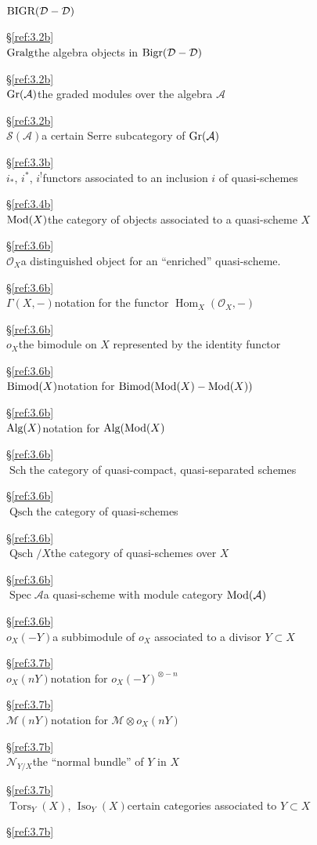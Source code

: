 \documentclass{amsproc}
\def\Ascr{{\mathcal A}}
\def\Dscr{{\mathcal D}}
\def\Mscr{{\mathcal M}}
\def\Nscr{{\mathcal N}}
\def\Oscr{{\mathcal O}}
\def\Sscr{{\mathcal S}}
\def\Mod{\mathop{\text{Mod}}}
\def\Bimod{\mathop{\text{Bimod}}}
\def\Gr{\mathop{\text{Gr}}}
\def\Bigr{\mathop{\text{Bigr}}}
\def\BIGR{\mathop{\text{BIGR}}}
\def\Alg{\mathop{\text{Alg}}}
\def\Gralg{\mathop{\text{Gralg}}}
\def\Sch{\operatorname{Sch}}
\def\Iso{\operatorname{Iso}}
\def\Tors{\operatorname{Tors}}
\def\QSch{\operatorname{Qsch}}
\def\Spec{\operatorname {Spec}}
\def\Hom{\operatorname {Hom}}
\def\Tors{\operatorname {Tors}}
\let\oldtext\text
\def\text#1{\oldtext{\upshape #1}}
\theoremstyle{definition}
\theoremstyle{remark}
\numberwithin{equation}{section}
\numberwithin{table}{section}
\numberwithin{figure}{section}
\def\Gr{\mathop{\text{Gr}}}
\begin{document}
\begin{tabbing}
$\BIGR(\Dscr-\Dscr)$\>\strut\hfill\S\ref{ref:3.2b}\>\\ $\Gralg$\>the
algebra objects in
$\Bigr(\Dscr-\Dscr)$\>\strut\hfill\S\ref{ref:3.2b}\>\\
$\Gr(\Ascr)$\>the graded modules over the algebra
$\Ascr$\>\strut\hfill\S\ref{ref:3.2b}\>\\
$\Sscr(\Ascr)$\>a certain Serre subcategory of $\Gr(\Ascr)$
\>\strut\hfill\S\ref{ref:3.3b}\>\\
$i_\ast$, $i^\ast$, $i^!$\>functors associated to an inclusion $i$ of
quasi-schemes\>\strut\hfill\S\ref{ref:3.4b}\>\\
$\Mod(X)$\>the category of objects associated to a quasi-scheme $X$\>
\strut\hfill\S\ref{ref:3.6b}\>\\
$\Oscr_X$\>a distinguished object for an ``enriched'' quasi-scheme.
\>\strut\hfill\S\ref{ref:3.6b}\>\\
$\Gamma(X,-)$\>notation for the functor $\Hom_X(\Oscr_X,-)$
\>\strut\hfill\S\ref{ref:3.6b}\>\\ 
$o_X$\>the bimodule on $X$ represented by the identity functor\>
\strut\hfill\S\ref{ref:3.6b}\>\\
$\Bimod(X)$\>notation for
$\Bimod(\Mod(X)-\Mod(X))$\>\strut\hfill\S\ref{ref:3.6b}\>\\ 
$\Alg(X)$\>notation for $\Alg(\Mod(X)$\>\strut\hfill\S\ref{ref:3.6b}\>\\
$\Sch$\>the category of quasi-compact, quasi-separated
schemes\>\strut\hfill\S\ref{ref:3.6b}\>\\ 
$\QSch$\>the category of quasi-schemes\>\strut\hfill\S\ref{ref:3.6b}\>\\ 
$\QSch/X$\>the category of quasi-schemes over $X$\>\strut\hfill\S\ref{ref:3.6b}\>\\ 
$\Spec \Ascr$\>a quasi-scheme with module category $\Mod(\Ascr)$\>\strut\hfill\S\ref{ref:3.6b}\>\\ 
$o_X(-Y)$\>a subbimodule of $o_X$ associated to a divisor
$Y\subset X$\>\strut\hfill\S\ref{ref:3.7b}\>\\
$o_X(nY)$\>notation for $o_X(-Y)^{\otimes
-n}$\>\strut\hfill\S\ref{ref:3.7b}\>\\
$\Mscr(nY)$\>notation for $\Mscr\otimes o_X(nY)$\>\strut\hfill\S\ref{ref:3.7b}\>\\
$\Nscr_{Y/X}$\>the ``normal bundle'' of $Y$ in $X$\>\strut\hfill\S\ref{ref:3.7b}\>\\
$\Tors_Y(X)$, 
$\Iso_Y(X)$\>certain categories associated to  $Y\subset X$\>
\strut\hfill\S\ref{ref:3.7b}\>\\ 

\end{tabbing}
\end{document}
